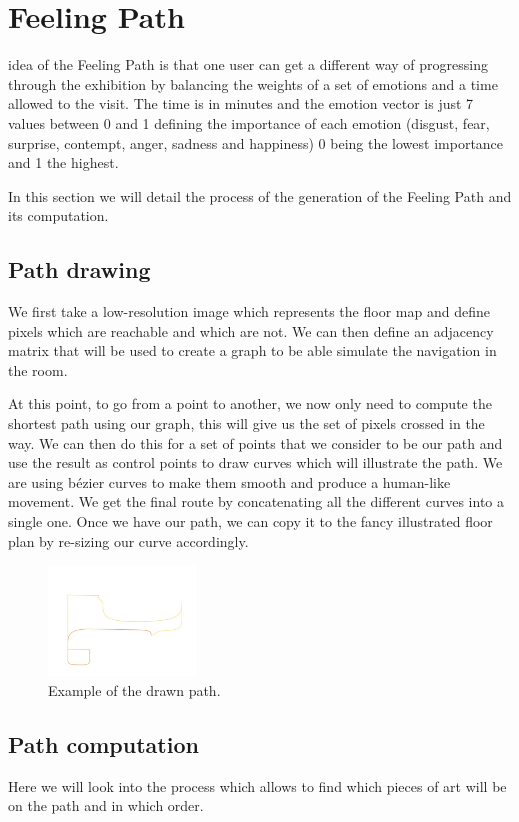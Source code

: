 \documentclass[journal, a4paper]{IEEEtran}
\begin{document}
\section{Feeling Path} \label{sec:path}
 idea of the Feeling Path is that one user can get a different way of progressing through the exhibition by balancing the weights of a set of emotions and a time allowed to the visit. The time is in minutes and the emotion vector is just 7 values between 0 and 1 defining the importance of each emotion (disgust, fear, surprise, contempt, anger, sadness and happiness) 0 being the lowest importance and 1 the highest.

In this section we will detail the process of the generation of the Feeling Path and its computation.

\subsection{Path drawing}
We first take a low-resolution image which represents the floor map and define pixels which are reachable and which are not. We can then define an adjacency matrix that will be used to create a graph to be able simulate the navigation in the room. 

At this point, to go from a point to another, we now only need to compute the shortest path using our graph, this will give us the set of pixels crossed in the way. We can then do this for a set of points that we consider to be our path and use the result as control points to draw curves which will illustrate the path. We are using b\'ezier curves to make them smooth and produce a human-like movement. We get the final route by concatenating all the different curves into a single one.
Once we have our path, we can copy it to the fancy illustrated floor plan by re-sizing our curve accordingly.

\begin{figure}[!h]
  \centering
    \includegraphics[width=0.35\textwidth]{sPath.jpg}
  \caption{Example of the drawn path.}
  \label{fig:path}
\end{figure}

\subsection{Path computation}
Here we will look into the process which allows to find which pieces of art will be on the path and in which order.
\end{document}
